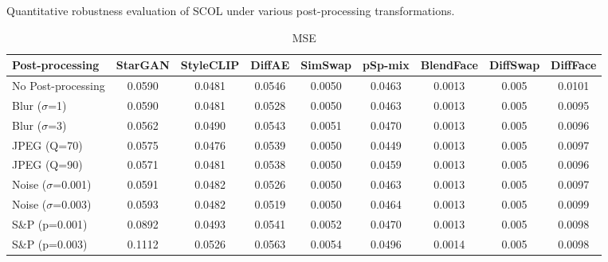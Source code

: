 \documentclass{article}
\begin{document}
\begin{table}[h!]
\caption{Quantitative robustness evaluation of SCOL under various post-processing transformations.}
\label{tab:robust_scol}
\centering
\small

\begin{subtable}{\textwidth}
\caption{MSE}
\centering
\scriptsize
\begin{tabular}{lcccccccc}
\toprule
\textbf{Post-processing} & StarGAN & StyleCLIP & DiffAE & SimSwap & pSp-mix & BlendFace & DiffSwap & DiffFace \\
\midrule
No Post-processing & 0.0590 & 0.0481 & 0.0546 & 0.0050 & 0.0463 & 0.0013 & 0.005 & 0.0101 \\
\midrule
Blur ($\sigma$=1) & 0.0590 & 0.0481 & 0.0528 & 0.0050 & 0.0463 & 0.0013 & 0.005 & 0.0095 \\
Blur ($\sigma$=3) & 0.0562 & 0.0490 & 0.0543 & 0.0051 & 0.0470 & 0.0013 & 0.005 & 0.0096 \\
JPEG (Q=70) & 0.0575 & 0.0476 & 0.0539 & 0.0050 & 0.0449 & 0.0013 & 0.005 & 0.0097 \\
JPEG (Q=90) & 0.0571 & 0.0481 & 0.0538 & 0.0050 & 0.0459 & 0.0013 & 0.005 & 0.0096 \\
Noise ($\sigma$=0.001) & 0.0591 & 0.0482 & 0.0526 & 0.0050 & 0.0463 & 0.0013 & 0.005 & 0.0097 \\
Noise ($\sigma$=0.003) & 0.0593 & 0.0482 & 0.0519 & 0.0050 & 0.0464 & 0.0013 & 0.005 & 0.0099 \\
S\&P (p=0.001) & 0.0892 & 0.0493 & 0.0541 & 0.0052 & 0.0470 & 0.0013 & 0.005 & 0.0098 \\
S\&P (p=0.003) & 0.1112 & 0.0526 & 0.0563 & 0.0054 & 0.0496 & 0.0014 & 0.005 & 0.0098 \\
\bottomrule
\end{tabular}
\end{subtable}


\end{table}
\end{document}
